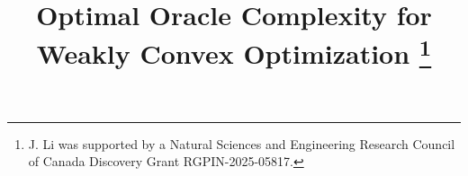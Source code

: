 \def\a{\bm{a}}
\def\b{\bm{b}}
\def\c{\bm{c}}
\def\d{\bm{d}}
\def\e{\bm{e}}
\def\f{\bm{f}}
\def\g{\bm{g}}
\def\h{\bm{h}}
\def\i{\bm{i}}
\def\j{\bm{j}}
\def\k{\bm{k}}
\def\l{\bm{l}}
\def\m{\bm{m}}
\def\n{\bm{n}}
\def\o{\bm{o}}
\def\p{\bm{p}}
\def\q{\bm{q}}
\def\r{\bm{r}}
\def\s{\bm{s}}
\def\t{\bm{t}}
\def\u{\bm{u}}
\def\v{\bm{v}}
\def\w{\bm{w}}
\def\x{\bm{x}}
\def\y{\bm{y}}
\def\z{\bm{z}}
\def\bz{{\mathbf 0}}
\def\lbd{{\lambda}}
\def\1{{\mathbf 1}}
\def\intm{{\rm int}}
\def\bmu{\bm{\mu}}
\def\blam{\bm{\lambda}}
\def\sA{{\mathsf{A}}}
\def\sZ{{\mathsf{Z}}}

\DeclareMathOperator{\cl}{cl}
\DeclareMathOperator{\dom}{dom}
\DeclareMathOperator{\kl}{KL}
\DeclareMathOperator{\rank}{rank}
\DeclareMathOperator{\codim}{codim}
\DeclareMathOperator{\aff}{aff}
\DeclareMathOperator{\spann}{span}
\DeclareMathOperator{\inter}{int}
\DeclareMathOperator{\rint}{rint}
\DeclareMathOperator{\bd}{bd}
\DeclareMathOperator{\rbd}{rbd}
\DeclareMathOperator{\rand}{rand} 

\newcommand{\jj}[1]{{{\textbf{\color{magenta}[Jiajin: #1]}}}}


%
%
%
%


\title{\large 
Optimal  Oracle Complexity for  Weakly Convex Optimization \thanks{J. Li was supported by a Natural Sciences and Engineering Research Council of Canada
Discovery Grant RGPIN-2025-05817. }
}












